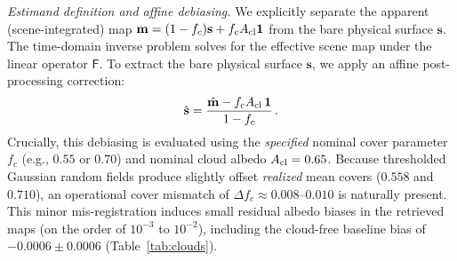 \documentclass[twocolumn,10pt]{article}
\begin{document}
\emph{Estimand definition and affine debiasing.} We explicitly separate the apparent (scene-integrated) map $\mathbf{m} = (1 - f_c)\mathbf{s} + f_c A_{\rm cl}\mathbf{1}$ from the bare physical surface $\mathbf{s}$. The time-domain inverse problem solves for the effective scene map under the linear operator $\mathsf{F}$. To extract the bare physical surface $\mathbf{s}$, we apply an affine post-processing correction:
\begin{equation}
\hat{\mathbf{s}}=\frac{\hat{\mathbf{m}}-f_cA_{\rm cl}\,\mathbf{1}}{1-f_c}\,.
\label{eq:debias}
\end{equation}
Crucially, this debiasing is evaluated using the \emph{specified} nominal cover parameter $f_c$ (e.g., $0.55$ or $0.70$) and nominal cloud albedo $A_{\rm cl}=0.65$. Because thresholded Gaussian random fields produce slightly offset \emph{realized} mean covers ($0.558$ and $0.710$), an operational cover mismatch of $\Delta f_c \approx 0.008$--$0.010$ is naturally present. This minor mis-registration induces small residual albedo biases in the retrieved maps (on the order of $10^{-3}$ to $10^{-2}$), including the cloud-free baseline bias of $-0.0006\pm0.0006$ (Table~\ref{tab:clouds}).
\end{document}
